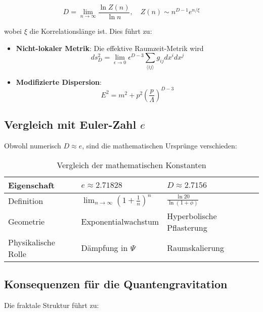 \begin{equation}
D = \lim_{n\to\infty} \frac{\ln Z(n)}{\ln n}, \quad Z(n) \sim n^{D-1}e^{n/\xi}
\end{equation}

wobei $\xi$ die Korrelationslänge ist. Dies führt zu:

\begin{itemize}
\item \textbf{Nicht-lokaler Metrik}: Die effektive Raumzeit-Metrik wird
\begin{equation}
ds^2_D = \lim_{\epsilon\to 0} \epsilon^{D-3} \sum_{\langle ij\rangle} g_{ij} dx^i dx^j
\end{equation}

\item \textbf{Modifizierte Dispersion}:
\begin{equation}
E^2 = m^2 + p^2 \left(\frac{p}{\Lambda}\right)^{D-3}
\end{equation}
\end{itemize}

\subsection{Vergleich mit Euler-Zahl $e$}
\label{subsec:euler_comparison}

Obwohl numerisch $D \approx e$, sind die mathematischen Ursprünge verschieden:

\begin{table}[h]
\centering
\caption{Vergleich der mathematischen Konstanten}
\begin{tabular}{lll}
\toprule
Eigenschaft & $e \approx 2.71828$ & $D \approx 2.7156$ \\
\midrule
Definition & $\lim_{n\to\infty}(1+\frac{1}{n})^n$ & $\frac{\ln 20}{\ln(1+\phi)}$ \\
Geometrie & Exponentialwachstum & Hyperbolische Pflasterung \\
Physikalische Rolle & Dämpfung in $\Psi$ & Raumskalierung \\
\bottomrule
\end{tabular}
\end{table}

\subsection{Konsequenzen für die Quantengravitation}
\label{subsec:quantum_gravity}

Die fraktale Struktur führt zu:

